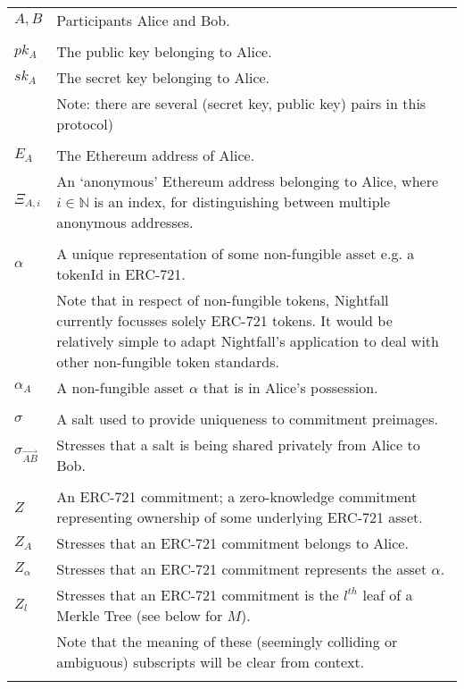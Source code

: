 \documentclass{article}
\begin{document}
\begin{center}
	\begin{tabular}{lp{14cm}}
    $A, B$      & Participants Alice and Bob.\\
    \\
    $pk_A$      & The public key belonging to Alice.\\
    $sk_A$      & The secret key belonging to Alice.\\
                & Note: there are several (secret key, public key) pairs in this protocol)\\
    \\
		$E_A$       & The Ethereum address of Alice.\\
		$\Xi_{A,i}$ & An `anonymous' Ethereum address belonging to Alice, where $i\in\mathbb{N}$ is an index, for distinguishing between multiple anonymous addresses. \\
    \\
    $\alpha$    & A unique representation of some non-fungible asset e.g. a tokenId in ERC-721.\\
                & Note that in respect of non-fungible tokens, Nightfall currently focusses solely ERC-721 tokens.
                  It would be relatively simple to adapt Nightfall's application to deal with other non-fungible token standards.\\
    $\alpha_A$  & A non-fungible asset $\alpha$ that is in Alice's possession. \\
    \\
		$\sigma$      & A salt used to provide uniqueness to commitment preimages.\\
		$\sigma_{\vec{AB}}$ & Stresses that a salt is being shared privately from Alice to Bob.\\
    \\
		$Z$         & An ERC-721 commitment; a zero-knowledge commitment representing ownership of some underlying ERC-721 asset. \\
    $Z_A$       & Stresses that an ERC-721 commitment belongs to Alice.\\
    $Z_{\alpha}$ & Stresses that an ERC-721 commitment represents the asset $\alpha$.\\
    $Z_{l}$     & Stresses that an ERC-721 commitment is the $l^{th}$ leaf of a Merkle Tree (see below for $M$).\\
                & Note that the meaning of these (seemingly colliding or ambiguous) subscripts will be clear from context.\\
    \\

\end{tabular}
\end{center}
\end{document}

